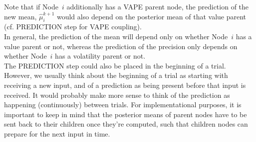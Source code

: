 Note that if Node~$i$ additionally has a \textsf{VAPE} parent node, the prediction of the new mean, $\hat{\mu}_i^{k+1}$ would also depend on the posterior mean of that value parent (cf. \textsf{PREDICTION step} for \textsf{VAPE} coupling).\\

In general, the prediction of the mean will depend only on whether Node~$i$ has a value parent or not, whereas the prediction of the precision only depends on whether Node~$i$ has a volatility parent or not. \\

The \textsf{PREDICTION step} could also be placed in the beginning of a trial. However, we usually think about the beginning of a trial as starting with receiving a new input, and of a prediction as being present before that input is received. It would probably make more sense to think of the prediction as happening (continuously) between trials. For implementational purposes, it is important to keep in mind that the posterior means of parent nodes have to be sent back to their children once they're computed, such that children nodes can prepare for the next input in time.

